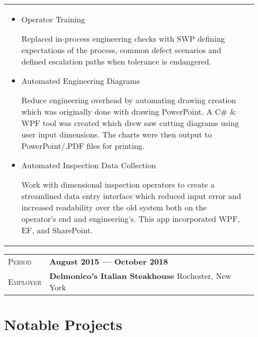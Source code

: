 \documentclass[a4paper, oneside, final, 10pt]{scrartcl} %
\newcommand{\gray}{\rowcolor[gray]{.90}} %
\newcommand{\Csharp}{C{\lserif\#}}
\begin{document}
\begin{center}
\begin{tabularx}{0.97\linewidth}{X|X}
\begin{itemize}
        \item{Operator Training}
        \begin{sloppypar}
            Replaced in-process engineering checks with SWP defining expectations of the process, common defect scenarios
            and defined escalation paths when tolerance is endangered.
        \end{sloppypar}
        \item {Automated Engineering Diagrams}
        \begin{sloppypar}
            Reduce engineering overhead by automating drawing creation which was originally done with drawing PowerPoint.
            A \Csharp{} \&{} WPF tool was created which drew saw cutting diagrams using user input dimensions. The charts were
            then output to PowerPoint/.PDF files for printing.
        \end{sloppypar}
        \item {Automated Inspection Data Collection}
        \begin{sloppypar}
            Work with dimensional inspection operators to create a streamlined data entry interface which reduced
            input error and increased readability over the old system both on the operator's end and engineering's. This
            app incorporated WPF, EF, and SharePoint.
        \end{sloppypar}
    \end{itemize}
\end{tabularx}

\begin{tabularx}{0.97\linewidth}{>{\raggedleft\scshape}p{2cm}X}
    \gray{}Period & \textbf{August 2015 --- October 2018}\\
    \gray{}Employer & \textbf{Delmonico's Italian Steakhouse} \hfill Rochester,  New York\\
\end{tabularx}


\section{Notable Projects}


\end{center}
\end{document}
